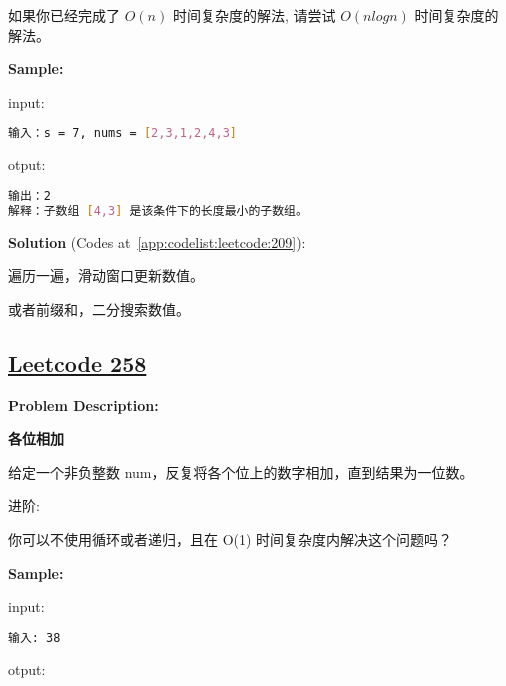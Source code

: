 如果你已经完成了 $ O(n) $ 时间复杂度的解法, 请尝试 $ O(n log n) $ 时间复杂度的解法。\par


\textbf{Sample:}\par

input:\par

\begin{lstlisting}[language=bash]
输入：s = 7, nums = [2,3,1,2,4,3]
\end{lstlisting}

otput:\par

\begin{lstlisting}[language=bash]
输出：2
解释：子数组 [4,3] 是该条件下的长度最小的子数组。
\end{lstlisting}

\textbf{Solution }(Codes at~\ref{app:codelist:leetcode:209}):\par

遍历一遍，滑动窗口更新数值。\par

或者前缀和，二分搜索数值。\par



\subsection{\href{https://leetcode-cn.com/}{Leetcode 258}}\label{app:problemlist:leetcode:258}

\textbf{Problem Description:}\par

\textbf{各位相加}\par

给定一个非负整数 num，反复将各个位上的数字相加，直到结果为一位数。\par

进阶:\par
你可以不使用循环或者递归，且在 O(1) 时间复杂度内解决这个问题吗？\par


\textbf{Sample:}\par

input:\par

\begin{lstlisting}[language=bash]
输入: 38

\end{lstlisting}

otput:\par

